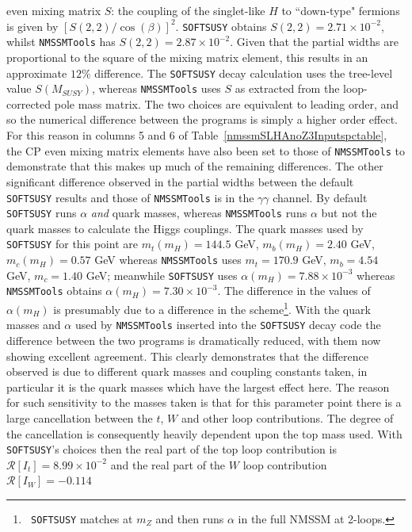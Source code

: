 \documentclass[final,3p,times,pdflatex]{elsarticle}
\begin{document}
even 
mixing matrix $S$: the coupling of the singlet-like $H$ to ``down-type"
fermions is given by $[S(2,2)/\cos(\beta)]^2$. {\tt SOFTSUSY}
obtains $S(2,2)
= 2.71 \times 10^{-2}$, whilst {\tt NMSSMTools} has $S(2,2) = 2.87 \times
10^{-2}$. Given that the partial widths are proportional to the square of the
mixing matrix element, this results in an approximate $12\%$ difference. 
The {\tt SOFTSUSY} decay calculation uses the tree-level value $S(M_{SUSY})$,
whereas {\tt NMSSMTools} uses $S$ as extracted from the loop-corrected pole
mass matrix. The two choices are equivalent to leading order, and so the
numerical difference between the programs is simply a higher order effect.
For
this reason in columns 5 and 6 of Table~\ref{nmssmSLHAnoZ3Inputspctable}, the
CP even mixing matrix elements have also been set to those of {\tt NMSSMTools}
to demonstrate that this makes up much of the remaining differences. The other
significant difference observed in the partial widths between the default {\tt
  SOFTSUSY} results and those of {\tt NMSSMTools} is in the $\gamma \gamma$
channel. By default {\tt SOFTSUSY} runs $\alpha$ {\em and}\/
quark masses, whereas {\tt NMSSMTools} runs $\alpha$
but not the quark masses to calculate the Higgs couplings. The quark masses
used by {\tt  
  SOFTSUSY} for this point are $m_t(m_{H}) = 144.5$ GeV, $m_{b}(m_{H}) =
2.40$ GeV, $m_c(m_{H}) 
= 0.57$ GeV whereas {\tt NMSSMTools} uses $m_t = 170.9$ GeV, $m_b = 4.54$ GeV,
$m_c = 1.40$ GeV; meanwhile {\tt SOFTSUSY} uses $\alpha(m_{H}) =
7.88\times10^{-3}$ whereas {\tt NMSSMTools} obtains
$\alpha(m_{H}) = 7.30\times10^{-3}$. The difference in the values of
$\alpha(m_H)$ 
is presumably due to a difference in the scheme\footnote{{\tt
  SOFTSUSY} matches at $m_Z$ and then runs $\alpha$ in the full NMSSM at
2-loops.}. With the quark masses and $\alpha$ used by {\tt NMSSMTools} inserted
into the {\tt SOFTSUSY} decay code the difference between the two programs is
dramatically reduced, with them now showing excellent agreement. 
This clearly
demonstrates that the difference observed is due to different quark masses and
coupling constants taken, in particular it is the quark masses which have the
largest effect here. The reason for such sensitivity to the masses taken is
that for this parameter point there is a large cancellation between the $t$, $W$
and other loop contributions. The degree of the cancellation is consequently
heavily dependent upon the top mass used. With {\tt SOFTSUSY}'s choices
then the real part of the top loop contribution is $\mathcal{R}[I_t] = 8.99 \times
10^{-2}$ and the real part of the $W$ loop contribution $\mathcal{R}[I_W] = -0.114$
\end{document}
